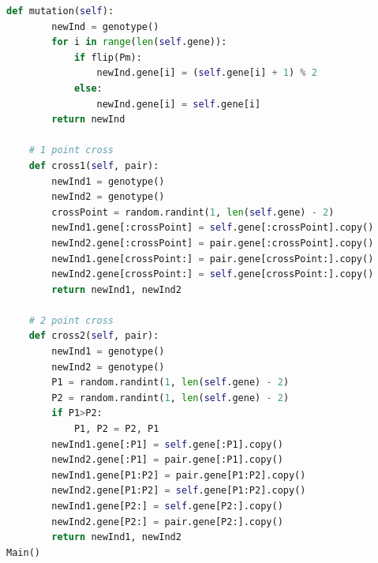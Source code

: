 \documentclass[11pt]{article} %
\begin{document}
\begin{lstlisting}[language={Python}]
    def mutation(self):
        newInd = genotype()
        for i in range(len(self.gene)):
            if flip(Pm):
                newInd.gene[i] = (self.gene[i] + 1) % 2
            else:
                newInd.gene[i] = self.gene[i]
        return newInd

	# 1 point cross
    def cross1(self, pair):
        newInd1 = genotype()
        newInd2 = genotype()
        crossPoint = random.randint(1, len(self.gene) - 2)
        newInd1.gene[:crossPoint] = self.gene[:crossPoint].copy()
        newInd2.gene[:crossPoint] = pair.gene[:crossPoint].copy()
        newInd1.gene[crossPoint:] = pair.gene[crossPoint:].copy()
        newInd2.gene[crossPoint:] = self.gene[crossPoint:].copy()
        return newInd1, newInd2

	# 2 point cross
    def cross2(self, pair):
        newInd1 = genotype()
        newInd2 = genotype()
        P1 = random.randint(1, len(self.gene) - 2)
        P2 = random.randint(1, len(self.gene) - 2)
        if P1>P2:
            P1, P2 = P2, P1
        newInd1.gene[:P1] = self.gene[:P1].copy()
        newInd2.gene[:P1] = pair.gene[:P1].copy()
        newInd1.gene[P1:P2] = pair.gene[P1:P2].copy()
        newInd2.gene[P1:P2] = self.gene[P1:P2].copy()
        newInd1.gene[P2:] = self.gene[P2:].copy()
        newInd2.gene[P2:] = pair.gene[P2:].copy()
        return newInd1, newInd2
Main()
\end{lstlisting}
\end{document}
